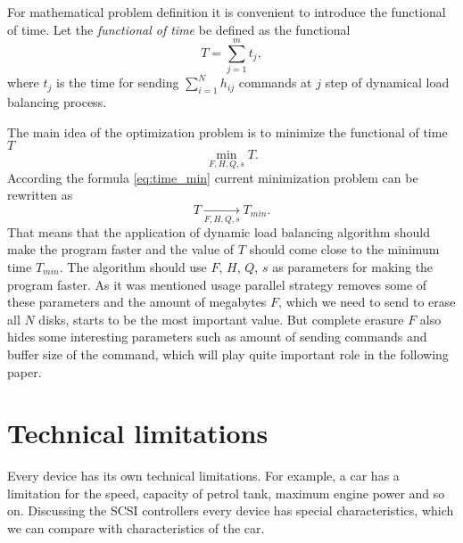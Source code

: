 For mathematical problem definition it is convenient to introduce the functional of time. Let the \emph{functional of time} be defined as the functional 
\begin{equation}
	T=\sum_{j=1}^{m}t_j,
\end{equation}
where $t_j$ is the time for sending $\sum_{i=1}^{N}h_{ij}$ commands at $j$ step of dynamical load balancing process.

The main idea of the optimization problem is to minimize the functional of time $T$
\begin{equation}
\label{opt_problem}
	\min_{F,H,Q,s}T.
\end{equation}
According the formula \ref{eq:time_min} current minimization problem can be rewritten as
\begin{equation}
	T \xrightarrow[F,H,Q,s]{} T_{min}.
\end{equation}
That means that the application of dynamic load balancing algorithm should make the program faster and the value of $T$ should come close to the minimum time $T_{min}$. The algorithm should use $F$, $H$, $Q$, $s$ as parameters for making the program faster. As it was mentioned usage parallel strategy removes some of these parameters and the amount of megabytes $F$, which we need to send to erase all $N$ disks, starts to be the most important value. But complete erasure $F$ also hides some interesting parameters such as amount of sending commands and buffer size of the command, which will play quite important role in the following paper.

\section{Technical limitations}
Every device has its own technical limitations. For example, a car has a limitation for the speed, capacity of petrol tank, maximum engine power and so on. Discussing the SCSI controllers every device has special characteristics, which we can compare with characteristics of the car.

